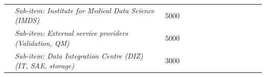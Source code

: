 \begin{table}[]
\begin{tabular}{llllrrrrcrrrrrr}
                                                         & \multicolumn{2}{l}{\cellcolor[HTML]{FFFF99}\textit{Sub-item: Institute for Medical Data Science (IMDS)}}        & \multicolumn{1}{r}{\cellcolor[HTML]{FFFF99}5000}  & \cellcolor[HTML]{FFFF99}                              & \multicolumn{1}{l}{\cellcolor[HTML]{FFFF99}\textit{}} & \multicolumn{1}{c}{\textit{}}                         & \multicolumn{1}{l}{\textit{}}                         & \cellcolor[HTML]{FFFF99}\textit{}                     & \multicolumn{1}{l}{\cellcolor[HTML]{92D050}\textit{\textbf{}}} & \multicolumn{1}{c}{}                                           & \multicolumn{1}{l}{\cellcolor[HTML]{92D050}\textit{}} & \multicolumn{1}{l}{\cellcolor[HTML]{FFFF99}\textit{}} & \multicolumn{1}{l}{\cellcolor[HTML]{BFBFBF}\textit{\textbf{}}}    & \multicolumn{1}{l}{\textit{\textbf{}}}                         \\
                                                         & \multicolumn{2}{l}{\cellcolor[HTML]{FFFF99}\textit{Sub-item: External service providers (Validation, QM)}}      & \multicolumn{1}{r}{\cellcolor[HTML]{FFFF99}5000}  & \cellcolor[HTML]{FFFF99}                              & \cellcolor[HTML]{FFFF99}\textit{}                     & \cellcolor[HTML]{FFFF99}\textit{}                     & \textit{}                                             & \cellcolor[HTML]{FFFF99}\textit{}                     & \cellcolor[HTML]{92D050}\textit{\textbf{}}                     & \cellcolor[HTML]{FFFF99}\textit{\textbf{}}                     & \cellcolor[HTML]{92D050}\textit{}                     & \cellcolor[HTML]{FFFF99}\textit{}                     & \cellcolor[HTML]{BFBFBF}\textit{\textbf{}}                        & \textit{\textbf{}}                                             \\
                                                         & \multicolumn{2}{l}{\cellcolor[HTML]{FFFF99}\textit{Sub-item: Data Integration Centre (DIZ) (IT, SAE, storage)}} & \multicolumn{1}{r}{\cellcolor[HTML]{FFFF99}3000}  & \cellcolor[HTML]{FFFF99}                              & \cellcolor[HTML]{FFFF99}\textit{}                     & \cellcolor[HTML]{FFFF99}\textit{}                     & \textit{}                                             & \cellcolor[HTML]{FFFF99}\textit{}                     & \cellcolor[HTML]{92D050}\textit{\textbf{}}                     & \cellcolor[HTML]{FFFF99}\textit{\textbf{}}                     & \cellcolor[HTML]{92D050}\textit{}                     & \cellcolor[HTML]{FFFF99}\textit{}                     & \cellcolor[HTML]{BFBFBF}\textit{\textbf{}}                        & \textit{\textbf{}}                                             \\

\end{tabular}
\end{table}
